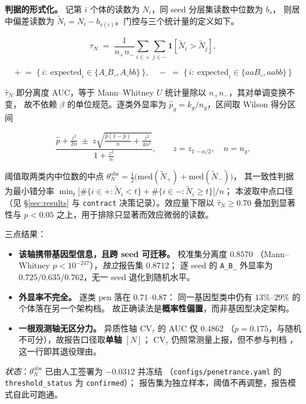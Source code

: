 \noindent\textbf{判据的形式化。} 记第 $i$ 个体的读数为 $N_i$，同 seed 分层集读数中位数为 $b_s$，
则居中偏差读数为 $\tilde N_i = N_i - b_{s(i)}$。门控与三个统计量的定义如下。

\[
\hat\tau_N \;=\; \frac{1}{n_+ n_-}\sum_{i\in +}\sum_{j\in -}
\mathbf{1}\!\left[\tilde N_i > \tilde N_j\right],\]

\[
+\;=\;\{\,i:\ \mathrm{expected}_i \in \{A\_B\_, A\_bb\}\,\},\quad
-\;=\;\{\,i:\ \mathrm{expected}_i \in \{aaB\_, aabb\}\,\}
\]

$\hat\tau_N$ 即分离度 AUC，等于 Mann--Whitney $U$ 统计量除以 $n_+n_-$，其对单调变换不变，
故不依赖 $\beta$ 的单位规范。逐类外显率为 $\hat p_g = k_g / n_g$，区间取 Wilson 得分区间

\[
\frac{\hat p + \frac{z^2}{2n} \;\pm\; z\sqrt{\frac{\hat p (1-\hat p)}{n} + \frac{z^2}{4n^2}}}{1 + \frac{z^2}{n}},
\qquad z = z_{1-\alpha/2}, \quad n = n_g,
\]

阈值取两类内中位数的中点 $\theta_N^{\mathrm{obs}} = \tfrac{1}{2}\big(\mathrm{med}(\tilde N_{+}) + \mathrm{med}(\tilde N_{-})\big)$，
其一致性判据为最小错分率
$\min_{t} \big[\#\{i\in+: \tilde N_i < t\} + \#\{i\in-: \tilde N_i \ge t\}\big] / n$；
本波取中点口径（见 \S\ref{sec:results} 与 \texttt{contract} 决策记录）。效应量下限以
$\hat\tau_N \ge 0.70$ 叠加到显著性与 $p<0.05$ 之上，用于排除只显著而效应微弱的读数。

三点结果：

\begin{itemize}
  \item \textbf{该轴携带基因型信息，且跨 seed 可迁移。} 校准集分离度 $0.8570$
        （Mann--Whitney $p<10^{-247}$），\emph{独立}报告集 $0.8712$；
        逐 seed 的 \texttt{A\_B\_} 外显率为 $0.725/0.635/0.762$，无一 seed 退化到随机水平。
  \item \textbf{外显率不完全。} 逐类 $\mathrm{pen}$ 落在 $0.71$--$0.87$：
        同一基因型类中仍有 $13\%$--$29\%$ 的个体落在另一个架构档。
        故正确读法是\textbf{概率性偏置}，而非基因型决定架构。
  \item \textbf{一根观测轴无区分力。} 异质性轴 $\mathrm{CV}_\tau$ 的 AUC 仅 $0.4862$
        （$p=0.175$，与随机不可分），故报告口径取\textbf{单轴} $[N]$；
        $\mathrm{CV}_\tau$ 仍照常测量上报，但不参与判档 ， 这一行即其退役理由。
\end{itemize}

\emph{状态}：$\theta_N^{\mathrm{obs}}$ 已由人工签署为 $-0.0312$ 并冻结
（\texttt{configs/penetrance.yaml} 的 \texttt{threshold\_status} 为 \texttt{confirmed}）；
报告集为独立样本，阈值不再调整，报告模式自此可跑通。

